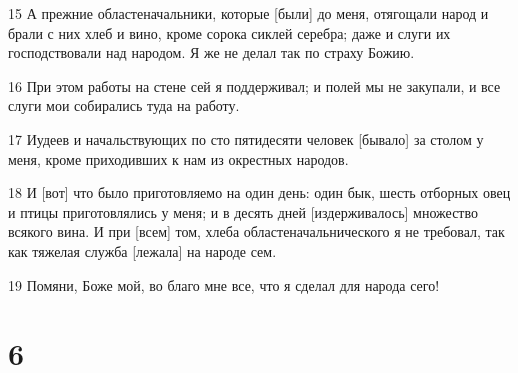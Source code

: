 \par 15 А прежние областеначальники, которые [были] до меня, отягощали народ и брали с них хлеб и вино, кроме сорока сиклей серебра; даже и слуги их господствовали над народом. Я же не делал так по страху Божию.
\par 16 При этом работы на стене сей я поддерживал; и полей мы не закупали, и все слуги мои собирались туда на работу.
\par 17 Иудеев и начальствующих по сто пятидесяти человек [бывало] за столом у меня, кроме приходивших к нам из окрестных народов.
\par 18 И [вот] что было приготовляемо на один день: один бык, шесть отборных овец и птицы приготовлялись у меня; и в десять дней [издерживалось] множество всякого вина. И при [всем] том, хлеба областеначальнического я не требовал, так как тяжелая служба [лежала] на народе сем.
\par 19 Помяни, Боже мой, во благо мне все, что я сделал для народа сего!

\chapter{6}

